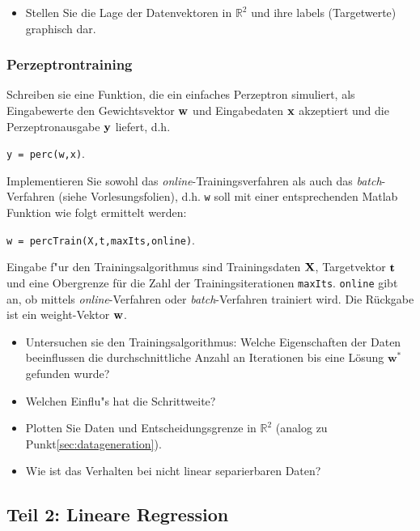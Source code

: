 \documentclass[a4]{article}
\begin{document}
\vspace{2mm}
\begin{itemize}
\item Stellen Sie die Lage der Datenvektoren in $\mathbb{R}^2$ und
ihre labels (Targetwerte) graphisch dar.
\end{itemize}

\subsubsection{Perzeptrontraining}
Schreiben sie eine Funktion, die ein einfaches Perzeptron simuliert,
als Eingabewerte den Gewichtsvektor ${\bf w}$ und Eingabedaten ${\bf x}$
akzeptiert und die Perzeptronausgabe ${\bf y}$ liefert, d.h.
\begin{center}
\texttt{y = perc(w,x)}.
\end{center}
Implementieren Sie sowohl das \emph{online}-Trainingsverfahren als auch das \emph{batch}-Verfahren (siehe Vorlesungsfolien),
d.h. \texttt{w} soll mit einer entsprechenden Matlab Funktion wie folgt ermittelt werden:
\begin{center}
\texttt{w = percTrain(X,t,maxIts,online)}.
\end{center}
Eingabe f"ur den Trainingsalgorithmus sind Trainingsdaten ${\bf X}$,
Targetvektor ${\bf t}$ und eine Obergrenze für die Zahl der
Trainingsiterationen \texttt{maxIts}. \texttt{online} gibt an, ob mittels \emph{online}-Verfahren oder \emph{batch}-Verfahren trainiert wird. Die Rückgabe ist ein weight-Vektor ${\bf w}$.

\vspace{2mm}
\begin{itemize}
\item Untersuchen sie den Trainingsalgorithmus:  Welche Eigenschaften der Daten beeinflussen die durchschnittliche Anzahl an Iterationen bis eine Lösung ${\mathbf w}^*$ gefunden wurde?
\item Welchen Einflu"s hat die Schrittweite?
\item Plotten Sie Daten und Entscheidungsgrenze in $\mathbb{R}^2$
(analog zu Punkt\ref{sec:datageneration}).
\item Wie ist das Verhalten bei nicht linear separierbaren Daten?
\end{itemize}

\subsection{Teil 2: Lineare Regression}
\end{document}
